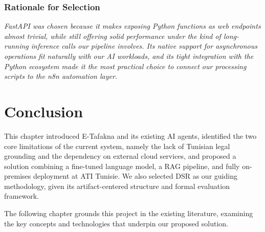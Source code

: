 \subsubsection*{Rationale for Selection}

{\itshape FastAPI was chosen because it makes exposing Python functions as web endpoints 
almost trivial, while still offering solid performance under the kind of 
long-running inference calls our pipeline involves. Its native support for 
asynchronous operations fit naturally with our \ac{AI} workloads, and its 
tight integration with the Python ecosystem made it the most practical choice 
to connect our processing scripts to the n8n automation layer.}

\section{Conclusion}

This chapter introduced E-Tafakna and its existing \ac{AI} agents, identified the
two core limitations of the current system, namely the lack of Tunisian legal
grounding and the dependency on external cloud services, and proposed a solution
combining a fine-tuned language model, a \ac{RAG} pipeline, and fully on-premises
deployment at \ac{ATI} Tunisie. We also selected \ac{DSR} as our guiding methodology,
given its artifact-centered structure and formal evaluation framework.

The following chapter grounds this project in the existing literature, examining
the key concepts and technologies that underpin our proposed solution.